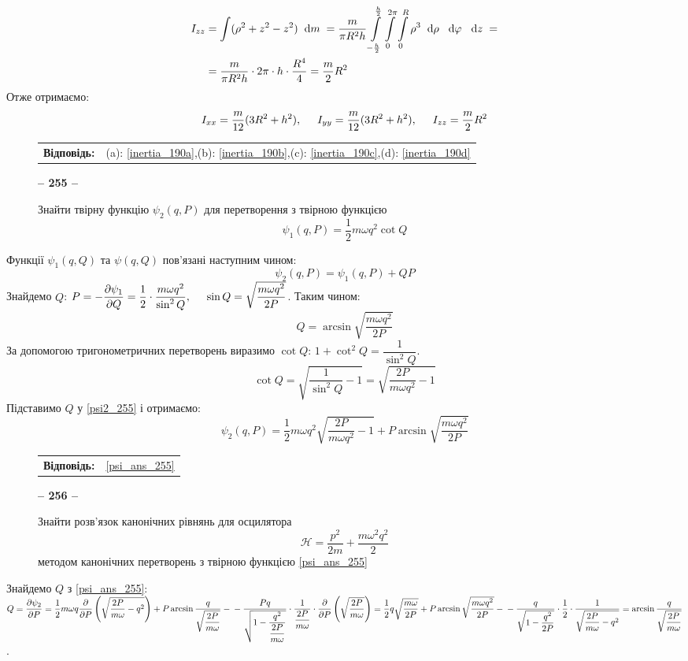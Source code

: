 \documentclass[a4paper,12pt]{article}
\newenvironment{task}[1]{\begin{figure*}[htp]\begin{framed}\begin{center}\textbf{-- {#1} --}\end{center}}{\end{framed}\end{figure*}}
\newenvironment{ans}[0]{\begin{figure*}[htp]\begin{center}\begin{tabular}{lc}\textbf{Відповідь:}\tab&}{\end{tabular}\end{center}\end{figure*}}
\newcommand\dx[1]{\hspace*{0.2cm}\textrm{d}{#1}\hspace*{0.1cm}}
\newcommand\tab [1][0.5cm]{\hspace*{#1}}
\newcommand\dint{\displaystyle\int}
\begin{document}
\begin{justify}
\begin{enumerate}[label=\alph*)]
\begin{align*}
					I_{zz}&=\dint(\rho^2+z^2-z^2)\dx{m}=\dfrac{m}{\pi R^2 h}\dint\limits_{-\frac h2}^{\frac h2}\dint\limits_0^{2\pi}\dint\limits_0^R\rho^3\dx{\rho}\dx{\varphi}\dx{z}=\\&=\dfrac{m}{\pi R^2 h}\cdot2\pi\cdot h\cdot\dfrac{R^4}{4}=\dfrac{m}2R^2
				\end{align*}
				Отже отримаємо:
				\begin{equation}
					I_{xx}=\dfrac{m}{12}(3R^2+h^2),\tab I_{yy}=\dfrac{m}{12}(3R^2+h^2),\tab I_{zz}=\dfrac{m}2R^2
					\label{inertia_190d}
				\end{equation}
		\end{enumerate}
		\begin{ans}
			(a): \cref{inertia_190a},\tab (b): \cref{inertia_190b},\tab (c): \cref{inertia_190c},\tab (d): \cref{inertia_190d}
		\end{ans}
		\begin{task}{255}
			Знайти твірну функцію $\psi_2(q, P)$ для перетворення з твірною функцією $$\psi_1(q,P)=\dfrac12m\omega q^2\cot Q$$
		\end{task}
		Функції $\psi_1(q,Q)$ та $\psi(q,Q)$ пов'язані наступним чином:
		\begin{equation}
			\psi_2(q, P)=\psi_1(q, P)+QP
			\label{psi2_255}
		\end{equation}
		Знайдемо $Q$: $P=-\dfrac{\partial\psi_1}{\partial Q}=\dfrac12\cdot\dfrac{m\omega q^2}{\sin^2Q},\tab \sin Q=\sqrt{\dfrac{m\omega q^2}{2P}}$. Таким чином: 
		$$
			Q=\arcsin\sqrt{\dfrac{m\omega q^2}{2P}}
		$$
		За допомогою тригонометричних перетворень виразимо $\cot Q$: $1+\cot^2Q=\dfrac1{\sin^2Q}$.
		$$\cot Q=\sqrt{\dfrac1{\sin^2Q}-1}=\sqrt{\dfrac{2P}{m\omega q^2}-1}$$
		Підставимо $Q$ у \cref{psi2_255} і отримаємо:
		\begin{equation}
			\psi_2(q, P)=\dfrac12m\omega q^2\sqrt{\dfrac{2P}{m\omega q^2}-1}+P\arcsin\sqrt{\dfrac{m\omega q^2}{2P}}
			\label{psi_ans_255}
		\end{equation}\newpage
		\begin{ans}
			\cref{psi_ans_255}
		\end{ans}
		\begin{task}{256}
			Знайти розв'язок канонічних рівнянь для осцилятора $$\mathcal{H}=\dfrac{p^2}{2m}+\dfrac{m\omega^2q^2}2$$ методом канонічних перетворень з твірною функцією \cref{psi_ans_255}
		\end{task}
		Знайдемо $Q$ з \cref{psi_ans_255}: $Q=\dfrac{\partial \psi_2}{\partial P}=\dfrac12m\omega  q\dfrac{\partial}{\partial P}\left(\sqrt{\dfrac{2P}{m\omega }-q^2}\right)+P\arcsin\dfrac{q}{\sqrt{\dfrac{2P}{m\omega }}}-\\-\dfrac{Pq}{\sqrt{1-\dfrac{q^2}{\dfrac{2P}{m\omega }}}}\cdot\dfrac1{\dfrac{2P}{m\omega }}\cdot\dfrac{\partial}{\partial P}\left(\sqrt{\dfrac{2P}{m\omega }}\right)=\dfrac12 q\sqrt{\dfrac{m\omega }{2P}}+P\arcsin\sqrt{\dfrac{m\omega q^2}{2P}}-\\-\dfrac{q}{\sqrt{1-\dfrac{q^2}{2P}}}\cdot\dfrac{1}{2}\cdot\dfrac1{\sqrt{\dfrac{2P}{m\omega}-q^2}}=\arcsin\dfrac{q}{\sqrt{\dfrac{2P}{m\omega}}}$. 

\end{justify}
\end{document}

